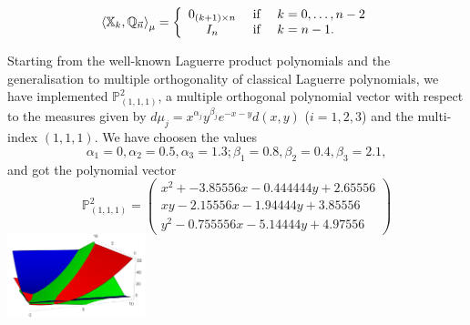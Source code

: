 \documentclass[portrait,final,a0paper,fontscale=0.38]{baposter}
\begin{document}
\begin{poster}
{\begin{equation}
    \left\langle \mathbb X_k , \mathbb Q_{\vec n} \right\rangle_\mu = \left\{\begin{array}{ccl}
        0_{(k+1)\times n} &   \text{ if } & k=0,\dots,n-2 \\
        I_n & \text{ if } & k=n-1.
    \end{array}\right.     
\end{equation}
}
%
{
Starting from the well-known Laguerre product polynomials and the generalisation to multiple orthogonality of classical Laguerre polynomials, we have implemented $\mathbb P_{(1,1,1)}^2$, a multiple orthogonal polynomial vector with respect to the measures given by $d\mu_j=x^{\alpha_j} y^{\beta_j} e^{-x-y} d(x,y)$ ($i=1,2,3$) and the multi-index $(1,1,1)$. We have choosen the values $$\alpha_1 = 0, \alpha_2 = 0.5, \alpha_3 = 1.3; \beta_1 = 0.8, \beta_2 = 0.4, \beta_3 = 2.1,$$ and got the polynomial vector 
$$
\mathbb P_{(1,1,1)}^2 = \begin{pmatrix}
    x^2 + - 3.85556 x - 0.444444 y + 2.65556 \\ x y - 2.15556 x - 1.94444 y + 3.85556 \\  y^2 - 0.755556 x - 5.14444 y + 4.97556
\end{pmatrix}
$$
\centering\includegraphics*[width=4cm]{EjemploLaguerre}


}








































\end{poster}
\end{document}
